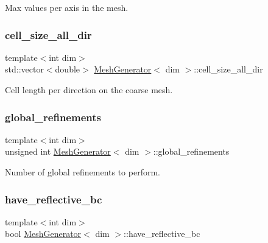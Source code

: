 Max values per axis in the mesh. 

\mbox{\label{class_mesh_generator_a55a1699f8cdb9418486af6b0fa3487cc}} 
\subsubsection{\texorpdfstring{cell\+\_\+size\+\_\+all\+\_\+dir}{cell\_size\_all\_dir}}
{\footnotesize\ttfamily template$<$int dim$>$ \\
std\+::vector$<$double$>$ \hyperlink{class_mesh_generator}{Mesh\+Generator}$<$ dim $>$\+::cell\+\_\+size\+\_\+all\+\_\+dir\hspace{0.3cm}{\ttfamily [private]}}



Cell length per direction on the coarse mesh. 

\mbox{\label{class_mesh_generator_af8fc6b25c91228ca1ccce7f1c7a2a526}} 
\subsubsection{\texorpdfstring{global\+\_\+refinements}{global\_refinements}}
{\footnotesize\ttfamily template$<$int dim$>$ \\
unsigned int \hyperlink{class_mesh_generator}{Mesh\+Generator}$<$ dim $>$\+::global\+\_\+refinements\hspace{0.3cm}{\ttfamily [private]}}



Number of global refinements to perform. 

\mbox{\label{class_mesh_generator_a7d6e17f844b8026a062b93ae12b1ee40}} 
\subsubsection{\texorpdfstring{have\+\_\+reflective\+\_\+bc}{have\_reflective\_bc}}
{\footnotesize\ttfamily template$<$int dim$>$ \\
bool \hyperlink{class_mesh_generator}{Mesh\+Generator}$<$ dim $>$\+::have\+\_\+reflective\+\_\+bc\hspace{0.3cm}{\ttfamily [private]}}



